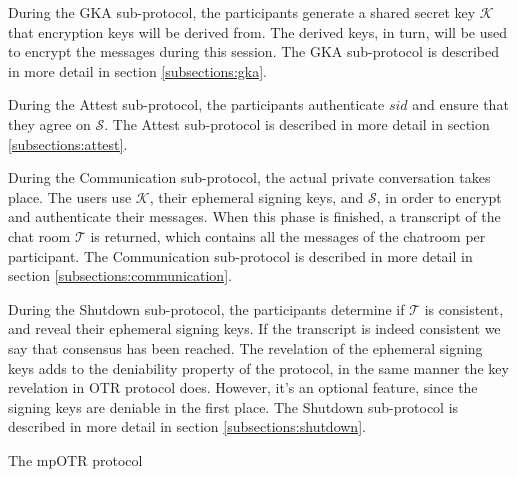 During the GKA sub-protocol, the participants generate a shared secret key $\mathcal{K}$ that encryption keys will be derived from. The derived keys, in turn, will be used to encrypt the messages during this session. The GKA sub-protocol is described in more detail in section \ref{subsections:gka}.

During the Attest sub-protocol, the participants authenticate $sid$ and ensure that they agree on $\mathcal{S}$. The Attest sub-protocol is described in more detail in section \ref{subsections:attest}. 

During the Communication sub-protocol, the actual private conversation takes place. The users use $\mathcal{K}$, their ephemeral signing keys, and $\mathcal{S}$, in order to encrypt and authenticate their messages. When this phase is finished, a transcript of the chat room $\mathcal{T}$ is returned, which contains all the messages of the chatroom per participant. The Communication sub-protocol is described in more detail in section \ref{subsections:communication}. 

During the Shutdown sub-protocol, the participants determine if $\mathcal{T}$ is consistent, and reveal their ephemeral signing keys. If the transcript is indeed consistent we say that consensus has been reached. The revelation of the ephemeral signing keys adds to the deniability property of the protocol, in the same manner the key revelation in OTR protocol does. However, it’s an optional feature, since the signing keys are deniable in the first place. The Shutdown sub-protocol is described in more detail in section \ref{subsections:shutdown}. 

\begin{algorithm}[t]
  \caption{The mpOTR protocol}
  \label{algorithms:mpotr_algo}
\end{algorithm}


